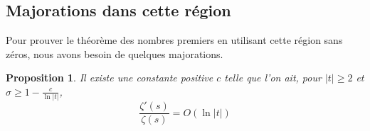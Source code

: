 \documentclass[french]{report}
\newtheorem{proposition}[theorem]{Proposition}
\begin{document}
\subsection{Majorations dans cette région}

Pour prouver le théorème des nombres premiers en utilisant cette région sans zéros, nous avons besoin de quelques majorations.

\begin{proposition}\label{prop:majoration-zeta-zeta-prime-region-classique}
  Il existe une constante positive $c$ telle que l'on ait, pour $|t|\geq2$ et $\sigma\geq1-\frac{c}{\ln|t|}$,
  \[ \frac{\zeta'(s)}{\zeta(s)} = O(\ln|t|) \]
\end{proposition}
\end{document}
